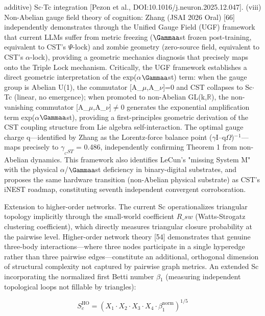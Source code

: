 \documentclass[a4paper,12pt]{article}
\begin{document}
additive) Sc$\cdot$Tc integration [Pezon et al., DOI:10.1016/j.neuron.2025.12.047]. (viii) Non-Abelian gauge field theory of cognition: Zhang (JSAI 2026 Oral) [66] independently demonstrates through the Unified Gauge Field (UGF) framework that current LLMs suffer from metric freezing ($\Gammaa$st frozen post-training, equivalent to CST's $\Psi$-lock) and zombie geometry (zero-source field, equivalent to CST's $\alpha$-lock), providing a geometric mechanics diagnosis that precisely maps onto the Triple Lock mechanism. Critically, the UGF framework establishes a direct geometric interpretation of the exp($\alpha$\cdot$\Gammaa$st) term: when the gauge group is Abelian U(1), the commutator [A_$\mu$,A_$\nu$]=0 and CST collapses to Sc$\cdot$Tc (linear, no emergence); when promoted to non-Abelian GL(k,$\mathbb{R}$), the non-vanishing commutator [A_$\mu$,A_$\nu$]$\neq$0 generates the exponential amplification term exp($\alpha$\cdot$\Gammaa$st), providing a first-principles geometric derivation of the CST coupling structure from Lie algebra self-interaction. The optimal gauge charge q---identified by Zhang as the Lorentz-force balance point ($\gamma$I--q$\Omega$)$^{-}$$^1$---maps precisely to $\gamma_{_CST}$ = 0.486, independently confirming Theorem 1 from non-Abelian dynamics. This framework also identifies LeCun's "missing System M" with the physical $\alpha$/$\Gammaa$st deficiency in binary-digital substrates, and proposes the same hardware transition (non-Abelian physical substrate) as CST's iNEST roadmap, constituting seventh independent convergent corroboration.


Extension to higher-order networks. The current Sc operationalizes triangular topology implicitly through the small-world coefficient $R\_{sw}$ (Watts-Strogatz clustering coefficient), which directly measures triangular closure probability at the pairwise level. Higher-order network theory [54] demonstrates that genuine three-body interactions---where three nodes participate in a single hyperedge rather than three pairwise edges---constitute an additional, orthogonal dimension of structural complexity not captured by pairwise graph metrics. An extended Sc incorporating the normalized first Betti number $\beta$$_1$ (measuring independent topological loops not fillable by triangles):


\begin{equation}

S_c^{\text{HO}} = (X_1 \cdot X_2 \cdot X_3 \cdot X_4 \cdot \beta_1^{\text{norm}})^{1/5}

\end{equation}
\end{document}
